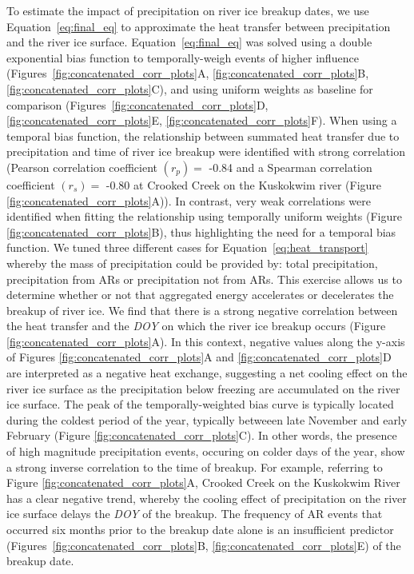 \documentclass[12pts,draft]{AR_analysis_}
\begin{document}
To estimate the impact of precipitation on river ice breakup dates, we use 
Equation~\ref{eq:final_eq} to approximate the heat transfer
between precipitation and the river ice surface.
Equation~\ref{eq:final_eq} was solved using a double exponential bias
function to temporally-weigh events of higher influence 
(Figures~\ref{fig:concatenated_corr_plots}A, 
\ref{fig:concatenated_corr_plots}B, 
\ref{fig:concatenated_corr_plots}C), and using
uniform weights as baseline for comparison 
(Figures~\ref{fig:concatenated_corr_plots}D, 
\ref{fig:concatenated_corr_plots}E,
\ref{fig:concatenated_corr_plots}F).
When using a temporal bias function, the relationship between summated
heat transfer due to precipitation and time of river ice breakup were
identified with strong correlation (Pearson correlation coefficient
$(r_{p} )=$ -0.84 and a Spearman correlation coefficient
$(r_{s}) =$ -0.80 at Crooked Creek on the Kuskokwim river
(Figure \ref{fig:concatenated_corr_plots}A)).
In contrast, very weak correlations were identified when fitting the
relationship using temporally uniform weights (Figure
\ref{fig:concatenated_corr_plots}B), thus highlighting the need
for a temporal bias function. We tuned three different cases for 
Equation~\ref{eq:heat_transport} whereby the mass of precipitation 
could be provided by: total precipitation, precipitation from ARs or 
precipitation not from ARs. 
This exercise allows us to 
determine whether or not that aggregated 
energy accelerates or decelerates the breakup of river ice. 
We find that there is a strong negative correlation between the heat 
transfer and the \emph{DOY} 
on which the river ice breakup occurs (Figure
\ref{fig:concatenated_corr_plots}A). In this context, negative values 
along the y-axis of Figures \ref{fig:concatenated_corr_plots}A and 
\ref{fig:concatenated_corr_plots}D 
are interpreted
as a negative heat exchange, suggesting a net cooling effect on the river ice
surface as the precipitation below freezing are accumulated
on the river ice surface. The
peak of the temporally-weighted bias curve is typically located during
the coldest period of the year, typically betweeen late November and
early February (Figure {\ref{fig:concatenated_corr_plots}}C).
In other words, the presence of high magnitude precipitation events, occuring 
on colder days of the 
year, show a strong inverse correlation to the time of breakup. 
For example, referring to Figure \ref{fig:concatenated_corr_plots}A, 
Crooked Creek on the 
Kuskokwim River has a
clear negative trend, whereby the cooling effect of precipitation on the
river ice surface delays the \emph{DOY} of the breakup. 
The frequency of AR events that occurred six months prior to
the breakup date alone is an insufficient predictor
(Figures~\ref{fig:concatenated_corr_plots}B,
\ref{fig:concatenated_corr_plots}E) of the breakup date. 
\end{document}
